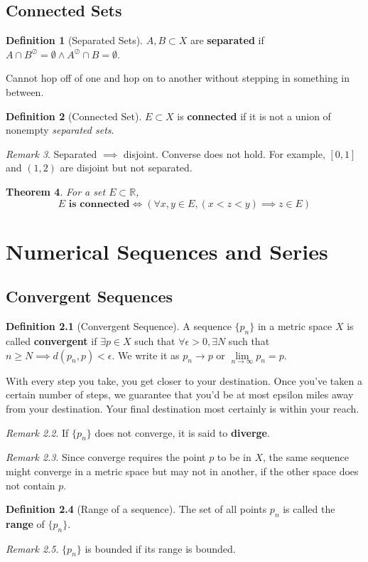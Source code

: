 \documentclass[a4paper,12pt]{report}
\newcommand{\R}{\mathbb{R}}
\newcommand{\tb}{\textbf}
\theoremstyle{plain}
\newtheorem{theorem}{\color{blue}Theorem}[chapter] %
\theoremstyle{definition}
\newtheorem{definition}[theorem]{\color{red}Definition} %
\theoremstyle{remark}
\newtheorem{remark}[theorem]{\color{ForestGreen}Remark} %
\begin{document}
\section{Connected Sets}
\begin{definition}[Separated Sets]
$A,B\subset X$ are \tb{separated} if $A\cap B^{\oslash}=\emptyset\wedge A^{\oslash}\cap B=\emptyset$.
\end{definition}
\begin{insight}[Separated]
Cannot hop off of one and hop on to another without stepping in something in between.
\end{insight}
\begin{definition}[Connected Set]
$E\subset X$ is \tb{connected} if it is not a union of nonempty \emph{separated sets}.
\end{definition}
\begin{remark}
Separated $\implies$ disjoint. Converse does not hold. For example, $[0,1]$ and $(1,2)$ are disjoint but not separated.
\end{remark}
\begin{theorem}
For a set $E\subset \R$,
\[
E \tb{ is connected} \iff \left(\forall x,y\in E, (x<z<y)\implies z\in E\right)
\]
\end{theorem}




\chapter{Numerical Sequences and Series}
\section{Convergent Sequences}
\begin{definition}[Convergent Sequence]
A sequence $\{p_n\}$ in a metric space $X$ is called \tb{convergent} if $\exists p\in X$ such that $\forall\epsilon>0,\exists N$ such that $n\ge N\implies d(p_n,p)<\epsilon$. We write it as $p_n\to p$ or $\lim\limits_{n \to \infty}p_n=p$.
\end{definition}
\begin{insight}
With every step you take, you get closer to your destination. Once you've taken a certain number of steps, we guarantee that you'd be at most epsilon miles away from your destination. Your final destination most certainly is within your reach.
\end{insight}
\begin{remark}
If $\{p_n\}$ does not converge, it is said to \tb{diverge}.
\end{remark}
\begin{remark}
Since converge requires the point $p$ to be in $X$, the same sequence might converge in a metric space but may not in another, if the other space does not contain $p$.
\end{remark}
\begin{definition}[Range of a sequence]
The set of all points $p_n$ is called the \tb{range} of $\{p_n\}$.
\end{definition}
\begin{remark}
$\{p_n\}$ is bounded if its range is bounded.
\end{remark}
\end{document}
